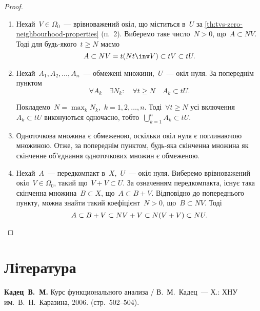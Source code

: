 \begin{proof}
    \listhack
    \begin{enumerate}
        \item Нехай~$V \in \Omega_0$~--- врівноважений окіл, що міститься в~$U$ за \cref{th:tvs-zero-neighbourhood-properties} (п.~2). Виберемо таке число~$N > 0$, що~$A \subset N V$. Тоді для будь-якого~$t \ge N$ маємо
        \begin{equation*}
            A \subset N V = t(N t\inv V) \subset t V \subset t U.
        \end{equation*}

        \item Нехай~$A_1, A_2, \dots, A_n$~--- обмежені множини,~$U$~--- окіл нуля. За попереднім пунктом
        \begin{equation*}
            \forall A_k \quad \exists N_k: \quad \forall t \ge N \quad A_k \subset t U.
        \end{equation*}

        Покладемо~$N = \max_k N_k$,~$k = 1, 2, \dots, n$. Тоді~$\forall t \ge N$ усі включення~$A_k \subset t U$ виконуються одночасно, тобто~$\bigcup_{k = 1}^n A_k \subset t U$.

        \item Одноточкова множина є обмеженою, оскільки окіл нуля є поглинаючою множиною. Отже, за попереднім пунктом, будь-яка скінченна множина як скінченне об'\-єд\-на\-ння одноточкових множин є обмеженою.

        \item Нехай~$A$~--- передкомпакт в~$X$,~$U$~--- окіл нуля. Виберемо врівноважений окіл~$V \in \Omega_0$, такий що~$V + V \subset U$. За означенням передкомпакта, існує така скінченна множина~$B \subset X$, що~$A \subset B + V$. Відповідно до попереднього пункту, можна знайти такий коефіцієнт~$N > 0$, що~$B \subset N V$. Тоді
        \begin{equation*}
            A \subset B + V \subset NV + V \subset N(V + V) \subset N U. \qedhere
        \end{equation*}
    \end{enumerate}
\end{proof}

\section{Література}

\begin{enumerate}[label={[\arabic*]}]
\item \textbf{Кадец~В.~М.}
Курс функционального анализа /
В.~М.~Кадец~---
Х.: ХНУ им.~В.~Н.~Каразина, 2006. (стр.~502--504).
\end{enumerate}

